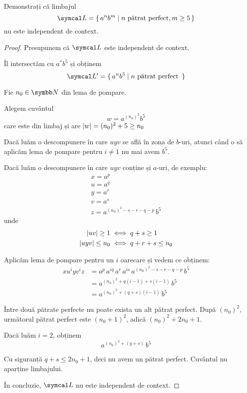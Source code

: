 \begin{exercise}
    Demonstrați că limbajul
    \[\limbaj = \set{ a^n b^m | n \text{ pătrat perfect}, m \geq 5 }\]
    nu este independent de context.
\end{exercise}
\begin{proof}
    Presupunem că \(\limbaj\) este independent de context.

    Îl intersectăm cu \(a^* b^5\) și obținem
    \[\limbaj' = \set{ a^n b^5 | n \text{ pătrat perfect } }\]

    Fie \(n_0 \in \naturals\) din lema de pompare.

    Alegem cuvântul
    \[w = a^{(n_0)^2} b^5\]
    care este din limbaj și are \(\left\lvert w\right\rvert = (n_0)^2 + 5 \geq n_0\)

    Dacă luăm o descompunere în care \(u y v\) se află în zona de \(b\)-uri, atunci când o să aplicăm lema de pompare pentru \(i \neq 1\) nu mai avem \(b^5\).

    Dacă luăm o descompunere în care \(u y v\) conține și \(a\)-uri, de exemplu:
    \begin{gather*}
        x = a^p \\
        u = a^q \\
        y = a^r \\
        v = a^s \\
        z = a^{(n_0)^2 - s - r - q - p} \, b^5
    \end{gather*}
    unde
    \begin{align*}
        \left\lvert uv\right\rvert \geq 1      & \iff q + s \geq 1       \\
        \left\lvert u y v\right\rvert \leq n_0 & \iff q + r + s \leq n_0
    \end{align*}

    Aplicăm lema de pompare pentru un \(i\) oarecare și vedem ce obținem:
    \begin{align*}
        x u^i y v^i z & = a^p \, a^{iq} \, a^r \, a^{is} \, a^{(n_0)^2 - s - r - q - p} \, b^5 \\
                      & = a^{(n_0)^2 + q (i - 1) + s (i - 1)} \, b^5                           \\
                      & = a^{(n_0)^2 + (q + s) (i - 1)} \, b^5
    \end{align*}

    Între două pătrate perfecte nu poate exista un alt pătrat perfect. După \((n_0)^2\), următorul pătrat perfect este \((n_0 + 1)^2\), adică \((n_0)^2 + 2 n_0 + 1\).

    Dacă luăm \(i = 2\), obținem
    \[a^{(n_0)^2 + (q + s)} \, b^5\]

    Cu siguranță \(q + s \leq 2 n_0 + 1\), deci nu avem un pătrat perfect. Cuvântul nu aparține limbajului.

    În concluzie, \(\limbaj\) nu este independent de context.
\end{proof}

